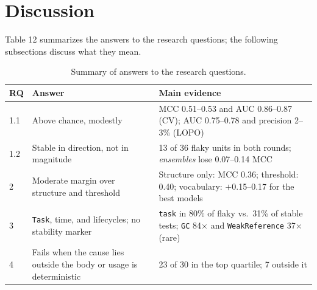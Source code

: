 \section{Discussion}
Table 12 summarizes the answers to the research questions; the following subsections discuss what they mean.

\begin{table}[!h]
\caption{Summary of answers to the research questions.}
\label{tab:resumo}
\centering
\footnotesize
\begin{tabular}{@{}lp{}p{}@{}}
\hline\hline
\textbf{RQ} & \textbf{Answer} & \textbf{Main evidence} \tabularnewline
\hline
1.1 & \raggedright Above chance, modestly & \raggedright MCC 0.51--0.53 and AUC 0.86--0.87 (CV); AUC 0.75--0.78 and precision 2--3\% (LOPO) \tabularnewline[2pt]
1.2 & \raggedright Stable in direction, not in magnitude & \raggedright 13 of 36 flaky units in both rounds; \emph{ensembles} lose 0.07--0.14 MCC \tabularnewline[2pt]
2 & \raggedright Moderate margin over structure and threshold & \raggedright Structure only: MCC 0.36; threshold: 0.40; vocabulary: $+$0.15--0.17 for the best models \tabularnewline[2pt]
3 & \raggedright \texttt{Task}, time, and lifecycles; no stability marker & \raggedright \texttt{task} in 80\% of flaky vs.\ 31\% of stable tests; \texttt{GC} 84$\times$ and \texttt{WeakReference} 37$\times$ (rare) \tabularnewline[2pt]
4 & \raggedright Fails when the cause lies outside the body or usage is deterministic & \raggedright 23 of 30 in the top quartile; 7 outside it \tabularnewline
\hline\hline
\end{tabular}
\end{table}


